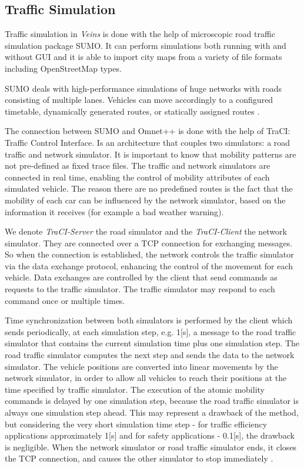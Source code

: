 \subsection{Traffic Simulation}

Traffic simulation in {\it Veins} is done with the help of microscopic road
traffic simulation package SUMO. It can perform simulations both running with
and without GUI and it is able to import city maps from a variety of file
formats including OpenStreetMap types.

SUMO deals with high-performance simulations of huge networks with roads
consisting of multiple lanes. Vehicles can move accordingly to a configured
timetable, dynamically generated routes, or statically assigned routes
\cite{veins}.

The connection between SUMO and Omnet++ is done with the help of TraCI: Traffic
Control Interface. Is an architecture that couples two simulators: a road
traffic and network simulator. It is important to know that mobility patterns
are not pre-defined as fixed trace files. The traffic and network simulators are
connected in real time, enabling the control of mobility attributes of each
simulated vehicle. The reason there are no predefined routes is the fact that
the mobility of each car can be influenced by the network simulator, based on
the information it receives (for example a bad weather warning).

We denote {\it TraCI-Server} the road simulator and the {\it TraCI-Client} the
network simulator. They are connected over a TCP connection for exchanging
messages. So when the connection is established, the network controls the
traffic simulator via the data exchange protocol, enhancing the control of the
movement for each vehicle. Data exchanges are controlled by the client that
send commands as requests to the traffic simulator. The traffic simulator
may respond to each command once or multiple times.

Time synchronization between both simulators is performed by the client which
sends periodically, at each simulation step, e.g. 1[s], a message to the road
traffic simulator that contains the current simulation time plus one simulation
step. The road traffic simulator computes the next step and sends the data to
the network simulator. The vehicle positions are converted into linear movements
by the network simulator, in order to allow all vehicles to reach their
positions at the time specified by traffic simulator. The execution of the
atomic mobility commands is delayed by one simulation step, because the road
traffic simulator is always one simulation step ahead. This may represent a
drawback of the method, but considering the very short simulation time step -
for traffic efficiency applications approximately 1[s] and for safety
applications - 0.1[s], the drawback is negligible. When the network simulator or
road traffic simulator ends, it closes the TCP connection, and causes the other
simulator to stop immediately \cite{traci_interface}.

